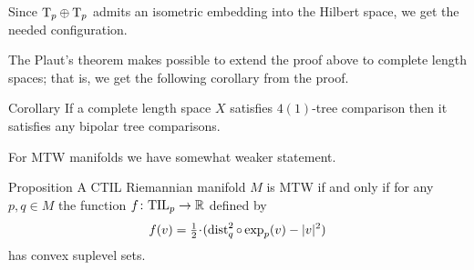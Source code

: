 Since $\mathrm{T}_p\oplus\mathrm{T}_p$ admits an isometric embedding into the Hilbert space,
we get the needed configuration.
\qeds

The Plaut's theorem makes possible to extend the proof above to complete length spaces;
that is, we get the following corollary from the proof.

\begin{thm}{Corollary}\label{cor:4(1)=>n(1)}
If a complete length space $X$ satisfies $4(1)$-tree comparison then it satisfies any bipolar tree comparisons.
\end{thm}

For MTW manifolds we have somewhat weaker statement.

\begin{thm}{Proposition}\label{prop:convexity}
A CTIL Riemannian manifold $M$ is MTW if and only if 
for any $p,q\in M$ the function $f\colon \mathrm{\rm TIL}_p\to \mathbb{R}$ defined by
\[f(v)=\tfrac12\cdot(\dist_q^2\circ\exp_p(v)-|v|^2)\] 
has convex suplevel sets.
\end{thm}